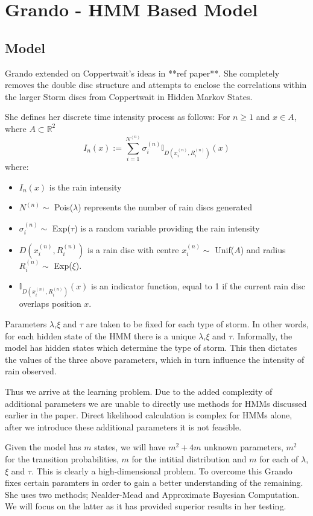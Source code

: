 \section{Grando - HMM Based Model}
\subsection{Model}
Grando extended on Coppertwait's ideas in **ref paper**. She completely removes the double disc structure and attempts to enclose the correlations within the larger Storm discs from Coppertwait in Hidden Markov States.

She defines her discrete time intensity process as follows:
For $n \geq 1$ and $x \in A$, where $A \subset \mathbb{R}^2$
\begin{equation}
    I_n(x) := \sum_{i=1}^{N^{(n)}} \sigma_i^{(n)} \mathbb{I}_{D(x_i^{(n)},R_i^{(n)})} (x)
\end{equation}
where:
\begin{itemize}
    \item $I_n(x)$ is the rain intensity
    \item $N^{(n)} \sim$ Pois($\lambda$) represents the number of rain discs generated
    \item $\sigma_i^{(n)} \sim$ Exp($\tau$) is a random variable providing the rain intensity
    \item  $D(x_i^{(n)},R_i^{(n)})$ is a rain disc with centre $x_i^{(n)} \sim$ Unif($A$) and radius $R_i^{(n)} \sim$ Exp($\xi$).
    \item $\mathbb{I}_{D(x_i^{(n)},R_i^{(n)})} (x)$ is an indicator function, equal to 1 if the current rain disc overlaps position $x$.
\end{itemize}

Parameters $\lambda$,$\xi$ and $\tau$ are taken to be fixed for each type of storm. In other words, for each hidden state of the HMM there is a unique $\lambda$,$\xi$ and $\tau$. Informally, the model has hidden states which determine the type of storm. This then dictates the values of the three above parameters, which in turn influence the intensity of rain observed.

Thus we arrive at the learning problem. Due to the added complexity of additional parameters we are unable to directly use methods for HMMs discussed earlier in the paper. Direct likelihood calculation is complex for HMMs alone, after we introduce these additional parameters it is not feasible. 

Given the model has $m$ states, we will have $m^2+4m$ unknown parameters, $m^2$ for the transition probabilities, $m$ for the intitial distribution and $m$ for each of $\lambda$,$\xi$ and $\tau$.  This is clearly a high-dimensional problem. To overcome this Grando fixes certain paramters in order to gain a better understanding of the remaining. She uses two methods; Nealder-Mead and Approximate Bayesian Computation. We will focus on the latter as it has provided superior results in her testing.

